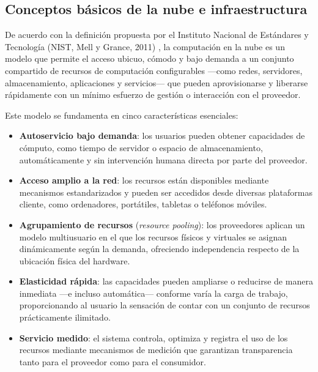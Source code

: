 \subsection*{Conceptos básicos de la nube e infraestructura}

De acuerdo con la definición propuesta por el Instituto Nacional de Estándares y Tecnología (NIST, Mell y Grance, 2011) \cite{Grance2011}, la computación en la nube es un modelo que permite el acceso ubicuo, cómodo y bajo demanda a un conjunto compartido de recursos de computación configurables —como redes, servidores, almacenamiento, aplicaciones y servicios— que pueden aprovisionarse y liberarse rápidamente con un mínimo esfuerzo de gestión o interacción con el proveedor.

Este modelo se fundamenta en cinco características esenciales:

\begin{itemize}
	\item \textbf{Autoservicio bajo demanda}: los usuarios pueden obtener capacidades de cómputo, como tiempo de servidor o espacio de almacenamiento, automáticamente y sin intervención humana directa por parte del proveedor.

	\item \textbf{Acceso amplio a la red}: los recursos están disponibles mediante mecanismos estandarizados y pueden ser accedidos desde diversas plataformas cliente, como ordenadores, portátiles, tabletas o teléfonos móviles.

	\item \textbf{Agrupamiento de recursos} (\textit{resource pooling}): los proveedores aplican un modelo multiusuario en el que los recursos físicos y virtuales se asignan dinámicamente según la demanda, ofreciendo independencia respecto de la ubicación física del hardware.

	\item \textbf{Elasticidad rápida}: las capacidades pueden ampliarse o reducirse de manera inmediata —e incluso automática— conforme varía la carga de trabajo, proporcionando al usuario la sensación de contar con un conjunto de recursos prácticamente ilimitado.

	\item \textbf{Servicio medido}: el sistema controla, optimiza y registra el uso de los recursos mediante mecanismos de medición que garantizan transparencia tanto para el proveedor como para el consumidor.
\end{itemize}

